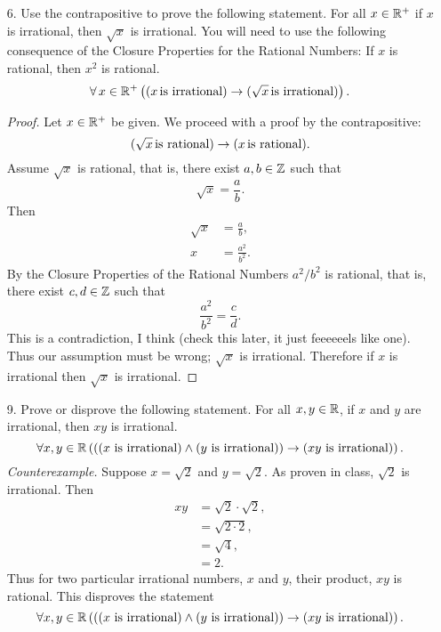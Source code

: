 \documentclass[a4paper, 12pt]{../../config/homework}
\begin{document}
\begin{enumerate}
\pagebreak
\item[6.] Use the contrapositive to prove the following statement. For all $x\in\mathbb{R}^+$ if $x$ is irrational, then $\sqrt{x}$ is irrational. You will need to use the following consequence of the Closure Properties for the Rational Numbers: If $x$ is rational, then $x^2$ is rational.
\[\forall\,x\in\mathbb{R}^+\left((x\,\text{is irrational}) \rightarrow (\sqrt{x} \,\text{is irrational})\right).\]
\begin{proof}
Let $x\in\mathbb{R}^+$ be given. We proceed with a proof by the contrapositive:
\[(\sqrt{x}\,\text{is rational}) \rightarrow (x \,\text{is rational}).\]
Assume $\sqrt{x}$ is rational, that is, there exist $a,b\in\mathbb{Z}$ such that
\[\sqrt{x} = \frac{a}{b}.\]
Then
\begin{align*}
\sqrt{x} &= \frac{a}{b},\\
x &= \frac{a^2}{b^2}.
\end{align*}
By the Closure Properties of the Rational Numbers $a^2/b^2$ is rational, that is, there exist $c,d\in\mathbb{Z}$ such that
\[\frac{a^2}{b^2} = \frac{c}{d}.\]
This is a contradiction, I think (check this later, it just feeeeeels like one).
Thus our assumption must be wrong; $\sqrt{x}$ is irrational. Therefore if $x$ is irrational then $\sqrt{x}$ is irrational.
\end{proof}

\pagebreak
\item[9.] Prove or disprove the following statement. For all $x,y\in\mathbb{R}$, if $x$ and $y$ are irrational, then $xy$ is irrational.
\[\forall x,y\in\mathbb{R}\left(\left(\left(x\ \text{is irrational}\right)\land\left(y\ \text{is irrational}\right)\right)\rightarrow\left(xy\ \text{is irrational}\right)\right).\]
\textit{Counterexample.} Suppose $x=\sqrt{2}$ and $y=\sqrt{2}$. As proven in class, $\sqrt{2}$ is irrational. Then
\begin{align*}
xy &= \sqrt{2}\cdot\sqrt{2},\\
&= \sqrt{2\cdot 2},\\
&= \sqrt{4},\\
&= 2.
\end{align*}
Thus for two particular irrational numbers, $x$ and $y$, their product, $xy$ is rational. This disproves the statement
\[\forall x,y\in\mathbb{R}\left(\left(\left(x\ \text{is irrational}\right)\land\left(y\ \text{is irrational}\right)\right)\rightarrow\left(xy\ \text{is irrational}\right)\right).\]


\end{enumerate}
\end{document}
